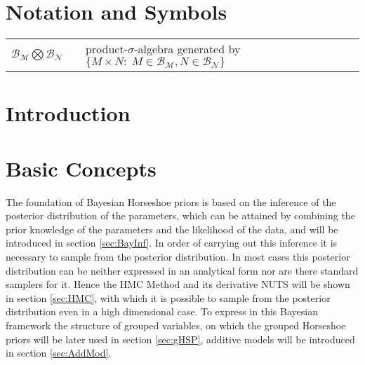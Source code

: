 \documentclass[12pt,letterpaper]{article}
\begin{document}
\newpage
\setcounter{page}{1}
\tableofcontents
\newpage


\pagestyle{fancy}
\fancyhf{}
\fancyhead[R]{\thepage}
\renewcommand{\headrulewidth}{0pt} 
\section*{Notation and Symbols}

\begin{tabular}{lll}
$\mathcal{B}_\mathcal{M}\bigotimes\mathcal{B}_\mathcal{N}$ & & product-$\sigma$-algebra generated by $\{M\times N :\; M\in\mathcal{B}_\mathcal{M}, N\in\mathcal{B}_\mathcal{N} \}$ 
\end{tabular}

\pagebreak
\section{Introduction}
\pagebreak

\section{Basic Concepts}
The foundation of Bayesian Horseshoe priors is based on the inference of the posterior distribution of the parameters, which can be attained by combining the prior knowledge of the parameters and the likelihood of the data, and will be introduced in section \ref{sec:BayInf}. In order of carrying out this inference it is necessary to sample from the posterior distribution.
In most cases this posterior distribution can be neither expressed in an analytical form nor are there standard samplers for it. Hence the HMC Method and its derivative NUTS will be shown in section \ref{sec:HMC}, with which it is possible to sample from the posterior distribution even in a high dimensional case. To express in this Bayesian framework the structure of grouped variables, on which the grouped Horseshoe priors will be later used in section \ref{sec:gHSP},  additive models will be introduced in section \ref{sec:AddMod}.
\end{document}
